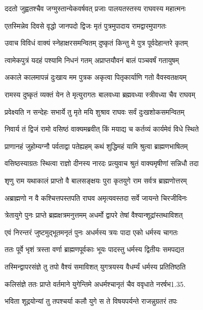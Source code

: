 \twolineshloka
{ददतो जुह्वतश्चैव जग्मुस्तान्येकवर्षवत्}
{प्रजाः पालयतस्तस्य राघवस्य महात्मनः}%

\twolineshloka
{एतस्मिन्नेव दिवसे वृद्धो जानपदो द्विजः}
{मृतं पुत्रमुपादाय रामद्वारमुपागतः}%

\twolineshloka
{उवाच विविधं वाक्यं स्नेहाक्षरसमन्वितम्}
{दुष्कृतं किन्तु मे पुत्र पूर्वदेहान्तरे कृतम्}%

\twolineshloka
{त्वामेकपुत्रं यदहं पश्यामि निधनं गतम्}
{अप्राप्तयौवनं बालं पञ्चवर्षं गतायुषम्}%

\twolineshloka
{अकाले कालमापन्नं दुःखाय मम पुत्रक}
{अकृत्वा पितृकार्याणि गतो वैवस्वतक्षयम्}%

\twolineshloka
{रामस्य दुष्कृतं व्यक्तं येन ते मृत्युरागतः}
{बालवध्या ब्रह्मवध्या स्त्रीवध्या चैव राघवम्}%

\twolineshloka
{प्रवेक्ष्यति न सन्देहः सभार्ये तु मृते मयि}
{शुश्राव राघवः सर्वं दुःखशोकसमन्वितम्}%

\twolineshloka
{निवार्य तं द्विजं रामो वसिष्ठं वाक्यमब्रवीत्}
{किं मयाद्य च कर्तव्यं कार्यमेवं विधे स्थिते}%

\twolineshloka
{प्राणानहं जुहोम्यग्नौ पर्वताद्वा पतेह्यहम्}
{कथं शुद्धिमहं यामि श्रुत्वा ब्राह्मणभाषितम्}%

\twolineshloka
{वसिष्ठस्याग्रतः स्थित्वा राज्ञो दीनस्य नारदः}
{प्रत्युवाच श्रुतं वाक्यमृषीणां सन्निधौ तदा}%

\twolineshloka
{शृणु राम यथाकालं प्राप्तो वै बालसङ्क्षयः}
{पुरा कृतयुगे राम सर्वत्र ब्राह्मणोत्तरम्}%

\twolineshloka
{अब्राह्मणो न वै कश्चित्तपस्तपति राघव}
{अमृत्यवस्तदा सर्वे जायन्ते चिरजीविनः}%

\twolineshloka
{त्रेतायुगे पुनः प्राप्ते ब्रह्मक्षत्रमनुत्तमम्}
{अधर्मो द्वापरे तेषां वैश्यान्शूद्रांस्तथाविशत्}%

\twolineshloka
{एवं निरन्तरं जुष्टमुद्भूतमनृतं पुनः}
{अधर्मस्य त्रयः पादा एको धर्मस्य चागतः}%

\twolineshloka
{ततः पूर्वे भृशं त्रस्ता वर्णा ब्राह्मणपूर्वकाः}
{भूयः पादस्तु धर्मस्य द्वितीयः समपद्यत}%

\twolineshloka
{तस्मिन्द्वापरसंज्ञे तु तपो वैश्यं समाविशत्}
{युगत्रयस्य वैधर्म्यं धर्मस्य प्रतितिष्ठति}%

\twolineshloka
{कलिसंज्ञे ततः प्राप्ते वर्तमाने युगेन्तिमे}
{अधर्मश्चानृतं चैव ववृधाते नरर्षभ1.35.}%

\twolineshloka
{भविता शूद्रयोन्यां तु तपश्चर्या कलौ युगे}
{स ते विषयपर्यन्ते राजन्नुग्रतरं तपः}%

